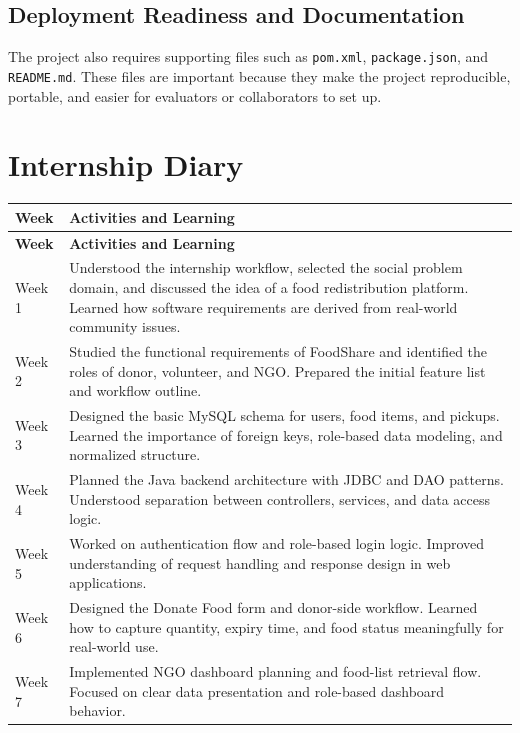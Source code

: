 \documentclass[12pt,a4paper]{report}
\newcommand{\projecttitle}{FoodShare}
\begin{document}
\section{Deployment Readiness and Documentation}
The project also requires supporting files such as \texttt{pom.xml}, \texttt{package.json}, and \texttt{README.md}. These files are important because they make the project reproducible, portable, and easier for evaluators or collaborators to set up.

\chapter{Internship Diary}

\renewcommand{\arraystretch}{1.5}
\footnotesize
\begin{longtable}{|p{1.8cm}|p{11.2cm}|}
\hline
\textbf{Week} & \textbf{Activities and Learning} \\
\hline
\endfirsthead
\hline
\textbf{Week} & \textbf{Activities and Learning} \\
\hline
\endhead
Week 1 & Understood the internship workflow, selected the social problem domain, and discussed the idea of a food redistribution platform. Learned how software requirements are derived from real-world community issues. \\
\hline
Week 2 & Studied the functional requirements of \projecttitle{} and identified the roles of donor, volunteer, and NGO. Prepared the initial feature list and workflow outline. \\
\hline
Week 3 & Designed the basic MySQL schema for users, food items, and pickups. Learned the importance of foreign keys, role-based data modeling, and normalized structure. \\
\hline
Week 4 & Planned the Java backend architecture with JDBC and DAO patterns. Understood separation between controllers, services, and data access logic. \\
\hline
Week 5 & Worked on authentication flow and role-based login logic. Improved understanding of request handling and response design in web applications. \\
\hline
Week 6 & Designed the Donate Food form and donor-side workflow. Learned how to capture quantity, expiry time, and food status meaningfully for real-world use. \\
\hline
Week 7 & Implemented NGO dashboard planning and food-list retrieval flow. Focused on clear data presentation and role-based dashboard behavior. \\

\end{longtable}
\end{document}
